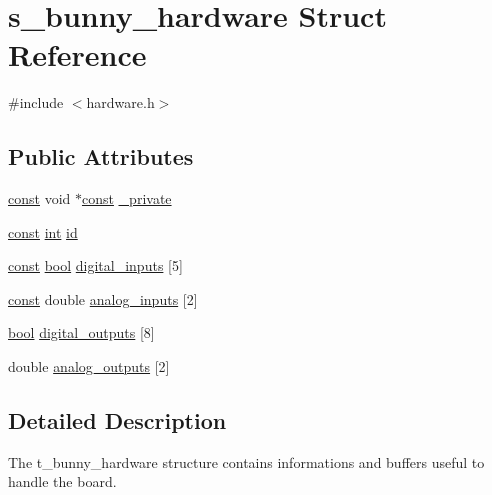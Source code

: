 \hypertarget{structs__bunny__hardware}{\section{s\-\_\-bunny\-\_\-hardware Struct Reference}
\label{structs__bunny__hardware}
}


{\ttfamily \#include $<$hardware.\-h$>$}

\subsection*{Public Attributes}
\begin{DoxyCompactItemize}
\item 
\hyperlink{term__entry_8h_a57bd63ce7f9a353488880e3de6692d5a}{const} void $\ast$\hyperlink{term__entry_8h_a57bd63ce7f9a353488880e3de6692d5a}{const} \hyperlink{structs__bunny__hardware_add026ee96be41faf560395aa39d3fe25}{\-\_\-private}
\item 
\hyperlink{term__entry_8h_a57bd63ce7f9a353488880e3de6692d5a}{const} \hyperlink{term__entry_8h_ad65b480f8c8270356b45a9890f6499ae}{int} \hyperlink{structs__bunny__hardware_ac432cb9537587d721684ef22d95e2a8d}{id}
\item 
\hyperlink{term__entry_8h_a57bd63ce7f9a353488880e3de6692d5a}{const} \hyperlink{term__entry_8h_a002004ba5d663f149f6c38064926abac}{bool} \hyperlink{structs__bunny__hardware_a7967f0f90cb718e96c5ed76ce6666fb5}{digital\-\_\-inputs} \mbox{[}5\mbox{]}
\item 
\hyperlink{term__entry_8h_a57bd63ce7f9a353488880e3de6692d5a}{const} double \hyperlink{structs__bunny__hardware_a19dd432d40c86ff1cb5931b0d5c344c6}{analog\-\_\-inputs} \mbox{[}2\mbox{]}
\item 
\hyperlink{term__entry_8h_a002004ba5d663f149f6c38064926abac}{bool} \hyperlink{structs__bunny__hardware_af94bf845a369eaba768f4658c2441103}{digital\-\_\-outputs} \mbox{[}8\mbox{]}
\item 
double \hyperlink{structs__bunny__hardware_a333c865cf78646f7ed3c25d99f85840c}{analog\-\_\-outputs} \mbox{[}2\mbox{]}
\end{DoxyCompactItemize}


\subsection{Detailed Description}
The t\-\_\-bunny\-\_\-hardware structure contains informations and buffers useful to handle the board.

